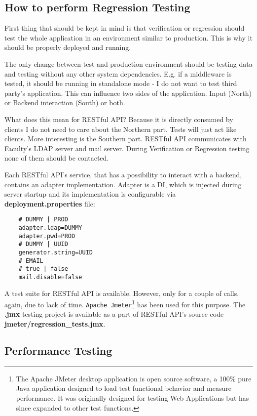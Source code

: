 	\subsection{How to perform Regression Testing}
	
	First thing that should be kept in mind is that verification or regression should test the whole application in an
	environment similar to production. This is why it should be properly deployed and running.
	
	The only change between test and production environment should be testing data and testing without any other system
	dependencies. E.g. if a middleware is tested, it should be running in standalone mode - I do not want to test third
	party's application. This can influence two sides of the application. Input (North) or Backend interaction (South) or
	both.
	
	What does this mean for RESTful API? Because it is directly consumed by clients I do not need to care about the
	Northern part. Tests will just act like clients. More interesting is the Southern part. RESTful API communicates with
	Faculty's LDAP server and mail server. During Verification or Regression testing none of them should be contacted.
	
	Each RESTful API's service, that has a possibility to interact with a backend, contains an adapter implementation.
	Adapter is a \gls{DI}, which is injected during server startup and its implementation is configurable via
	\textbf{deployment.properties} file:
	
	\begin{verbatim}
	# DUMMY | PROD
	adapter.ldap=DUMMY
	adapter.pwd=PROD
	# DUMMY | UUID
	generator.string=UUID
	# EMAIL
	# true | false
	mail.disable=false
	\end{verbatim}
	
	A test suite for RESTful API is available. However, only for a couple of calls, again, due to lack of time.
	\verb|Apache Jmeter|\footnote{\cite{jmeter} The Apache JMeter\textsuperscript{\texttrademark} desktop application is open
	source software, a 100\% pure Java application designed to load test functional behavior and measure performance. It was
	originally designed for testing Web Applications but has since expanded to other test functions.} has been used for
	this purpose. The \textbf{.jmx} testing project is available as a part of RESTful API's source code
	\textbf{jmeter/regression\_tests.jmx}.
	
	\subsection{Performance Testing}
	
